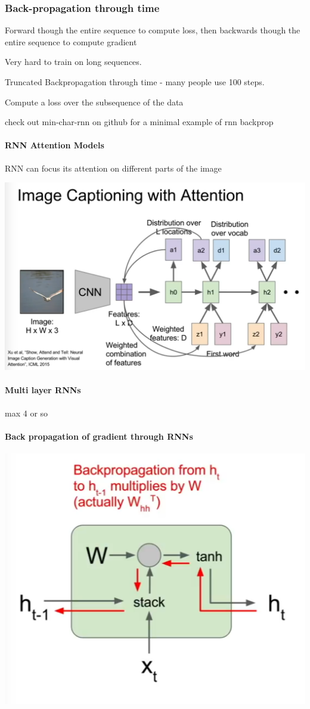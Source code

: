 \subsubsection{Back-propagation through time}

Forward though the entire sequence to compute loss, then backwards though the entire sequence to compute gradient

Very hard to train on long sequences.

Truncated Backpropagation through time - many people use 100 steps. 

Compute a loss over the subsequence of the data

check out min-char-rnn on github for a minimal example of rnn backprop

\paragraph{RNN Attention Models}

RNN can focus its attention on different parts of the image

\includegraphics[width=0.5\columnwidth]{fei_fei_li/lecture_10/image_captioning_with_attention.png}

\paragraph{Multi layer RNNs}

max 4 or so

\paragraph{Back propagation of gradient through RNNs}

\includegraphics[width=0.5\columnwidth]{fei_fei_li/lecture_10/back_prop_rnn.png}

